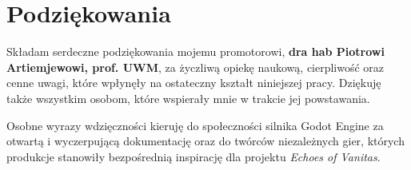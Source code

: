 
\section*{Podziękowania}

Składam serdeczne podziękowania mojemu promotorowi, \textbf{dra hab Piotrowi Artiemjewowi, prof. UWM}, za życzliwą opiekę naukową, cierpliwość oraz cenne uwagi, które wpłynęły na ostateczny kształt niniejszej pracy. Dziękuję także wszystkim osobom, które wspierały mnie w trakcie jej powstawania.

Osobne wyrazy wdzięczności kieruję do społeczności silnika Godot Engine za otwartą i wyczerpującą dokumentację oraz do twórców niezależnych gier, których produkcje stanowiły bezpośrednią inspirację dla projektu \textit{Echoes of Vanitas}.

\cleardoublepage
